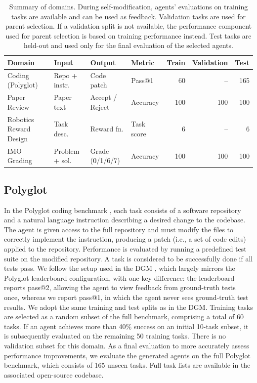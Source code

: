 \begin{table}[H]
\centering
\small
\setlength{\tabcolsep}{4pt}
\begin{tabular}{l l l l r r r}
\toprule
\textbf{Domain} & \textbf{Input} & \textbf{Output} & \textbf{Metric} & \textbf{Train} & \textbf{Validation} & \textbf{Test} \\
\midrule
Coding (Polyglot) & Repo + instr. & Code patch & Pass@1 & 60 & -- & 165 \\
Paper Review & Paper text & Accept / Reject & Accuracy & 100 & 100 & 100 \\
Robotics Reward Design & Task desc. & Reward fn. & Task score & 6 & -- & 6 \\
IMO Grading & Problem + sol. & Grade (0/1/6/7) & Accuracy & 100 & 100 & 100 \\
\bottomrule
\end{tabular}
\caption[Summary of domains]{Summary of domains. During self-modification, agents' evaluations on training tasks are available and can be used as feedback. Validation tasks are used for parent selection. If a validation split is not available, the performance component used for parent selection is based on training performance instead. Test tasks are held-out and used only for the final evaluation of the selected agents.}
\label{tab:domain-summary}
\end{table}

\subsection{Polyglot}
\label{app:domain-polyglot}

In the Polyglot coding benchmark \citep{gauthier2024polyglot}, each task consists of a software repository and a natural language instruction describing a desired change to the codebase. The agent is given access to the full repository and must modify the files to correctly implement the instruction, producing a patch (i.e., a set of code edits) applied to the repository. Performance is evaluated by running a predefined test suite on the modified repository. A task is considered to be successfully done if all tests pass. We follow the setup used in the DGM \citep{zhang2025darwin}, which largely mirrors the Polyglot leaderboard configuration, with one key difference: the leaderboard reports pass@2, allowing the agent to view feedback from ground-truth tests once, whereas we report pass@1, in which the agent never sees ground-truth test results. We adopt the same training and test splits as in the DGM. Training tasks are selected as a random subset of the full benchmark, comprising a total of 60 tasks. If an agent achieves more than 40\% success on an initial 10-task subset, it is subsequently evaluated on the remaining 50 training tasks. There is no validation subset for this domain. As a final evaluation to more accurately assess performance improvements, we evaluate the generated agents on the full Polyglot benchmark, which consists of 165 unseen tasks. Full task lists are available in the associated open-source codebase.

